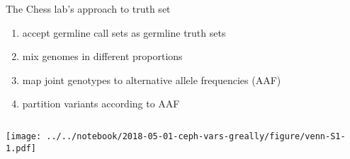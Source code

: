 \documentclass{beamer}
\begin{document}
\begin{frame}{The Chess lab's approach to truth set}
\begin{enumerate}
\item accept germline call sets as germline truth sets
\item<2> mix genomes in different proportions 
\item<3> map joint genotypes to alternative allele frequencies (AAF) 
\item<3> partition variants according to AAF 
\end{enumerate}
\begin{columns}[t]
\begin{column}{0.5\textwidth}

\texttt{[image: ../../notebook/2018-05-01-ceph-vars-greally/figure/venn-S1-1.pdf]}
\end{column}

\begin{column}{0.5\textwidth}

{\tiny
{}
\vfill
{}
}
\end{column}
\end{columns}
\end{frame}
\end{document}
